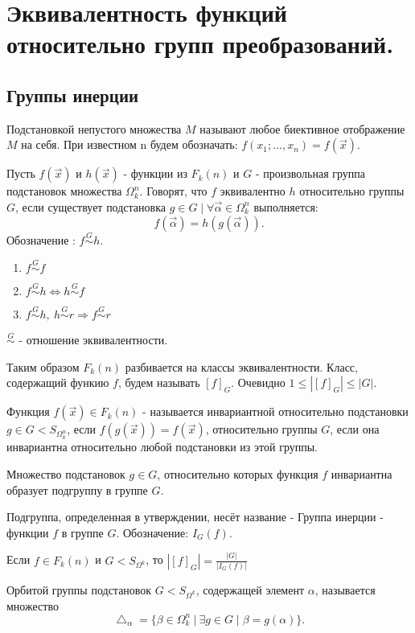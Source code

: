 \section{Эквивалентность функций относительно групп преобразований.}

\subsection{Группы инерции}

\opr Подстановкой непустого множества $M$ называют любое биективное отображение $M$ на себя.
При известном n будем обозначать: $f(x_1; \ldots, x_n)=f(\vec{x})$.

\opr Пусть $f(\vec{x})$ и $h(\vec{x})$ - функции из $F_k(n)$ и $G$ - произвольная группа подстановок множества $\Omega_k^n$.
Говорят, что $f$ эквивалентно $h$ относительно группы $G$, если существует подстановка $g \in G \mid \forall \vec{\alpha} \in \Omega_k^n$ выполняется:
$$
f(\vec{\alpha})=h(g(\vec{\alpha})).
$$
Обозначение : $f \stackrel{G}{\sim} h$.
 
\utv
\begin{enumerate}
  \item $f \stackrel{G}{\sim} f$
  \item $f \stackrel{G}{\sim} h \Leftrightarrow h \stackrel{G}{\sim} f$
  \item $f \stackrel{G}{\sim} h, \  h \stackrel{G}{\sim} r \Rightarrow f \stackrel{G}{\sim} r$
\end{enumerate}

$\stackrel{G}{\sim}$ - отношение эквивалентности.

Таким образом $F_k(n)$ разбивается на классы эквивалентности. Класс, содержащий функию $f$, будем называть $[f]_G$.
Очевидно $1 \leq |[f]_G|\leq|G|$.

\opr Функция $f(\vec{x}) \in F_k(n) $ - называется инвариантной относительно подстановки $g \in G < S_{\Omega_k^n}$,
если $f(g(\vec{x})) = f(\vec{x})$, относительно группы $G$, если она инвариантна относительно любой подстановки из этой группы.

\utv Множество подстановок $g \in G$, относительно которых функция $f$ инвариантна образует подгруппу в группе $G$.

\opr Подгруппа, определенная в утверждении, несёт название - Группа инерции - функции $f$ в группе $G$. Обозначение: $I_G(f)$.

\thr Если $f\in F_k(n)$ и $G < S_{\Omega^k}$, то $|[f]_G|=\frac{|G|}{|I_G(f)|}$

\opr Орбитой группы подстановок $G < S_{\Omega^k}$, содержащей элемент $\alpha$, называется множество
$$
\bigtriangleup_\alpha = \{ \beta \in \Omega_k^n\: |\:  \exists g\in G \mid \beta =g(\alpha)\}.
$$

